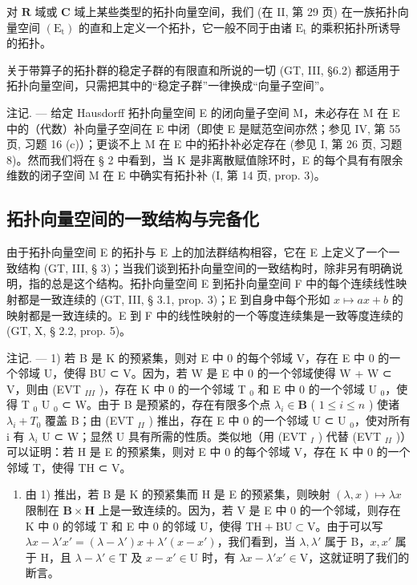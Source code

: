 对 \(\mathbf{R}\) 域或 \(\mathbf{C}\) 域上某些类型的拓扑向量空间，我们 (在 II, 第 29 页) 在一族拓扑向量空间 \((\mathrm{E}_{\mathrm{t}})\) 的直和上定义一个拓扑，它一般不同于由诸 \(\mathrm{E}_{\mathrm{t}}\) 的乘积拓扑所诱导的拓扑。

关于带算子的拓扑群的稳定子群的有限直和所说的一切 (GT, III, §6.2) 都适用于拓扑向量空间，只需把其中的“稳定子群”一律换成“向量子空间”。

注记. --- 给定 Hausdorff 拓扑向量空间 E 的闭向量子空间 M，未必存在 M 在 E 中的（代数）补向量子空间在 E 中闭（即使 E 是赋范空间亦然；参见 IV, 第 55 页, 习题 16 (c)）；更谈不上 M 在 E 中的拓扑补必定存在 (参见 I, 第 26 页, 习题 8)。然而我们将在 § 2 中看到，当 K 是非离散赋值除环时，E 的每个具有有限余维数的闭子空间 M 在 E 中确实有拓扑补 (I, 第 14 页, prop. 3)。

\subsection{拓扑向量空间的一致结构与完备化}

由于拓扑向量空间 E 的拓扑与 E 上的加法群结构相容，它在 E 上定义了一个一致结构 (GT, III, § 3)；当我们谈到拓扑向量空间的一致结构时，除非另有明确说明，指的总是这个结构。拓扑向量空间 E 到拓扑向量空间 F 中的每个连续线性映射都是一致连续的 (GT, III, § 3.1, prop. 3)；E 到自身中每个形如 \(x \mapsto ax + b\) 的映射都是一致连续的。E 到 F 中的线性映射的一个等度连续集是一致等度连续的 (GT, X, § 2.2, prop. 5)。

注记. --- 1) 若 B 是 K 的预紧集，则对 E 中 0 的每个邻域 V，存在 E 中 0 的一个邻域 U，使得 BU ⊂ V。因为，若 W 是 E 中 0 的一个邻域使得 W + W ⊂ V，则由 (EVT \(_{III}\) )，存在 K 中 0 的一个邻域 T \(_{0}\) 和 E 中 0 的一个邻域 U \(_{0}\)，使得 T \(_{0}\) U \(_{0}\) ⊂ W。由于 B 是预紧的，存在有限多个点 \(\lambda_{i} \in \mathbf{B}\) ( \(1 \leqslant i \leqslant n\) ) 使诸 \(\lambda_{i} + T_{0}\) 覆盖 B；由 (EVT \(_{II}\) ) 推出，存在 E 中 0 的一个邻域 U ⊂ U \(_{0}\)，使对所有 i 有 \(\lambda_{i}\) U ⊂ W；显然 U 具有所需的性质。类似地（用 (EVT \(_{I}\) ) 代替 (EVT \(_{II}\) )）可以证明：若 H 是 E 的预紧集，则对 E 中 0 的每个邻域 V，存在 K 中 0 的一个邻域 T，使得 TH ⊂ V。

\begin{enumerate}
\def\labelenumi{\arabic{enumi})}
\setcounter{enumi}{1}
\tightlist
\item
  由 1) 推出，若 B 是 K 的预紧集而 H 是 E 的预紧集，则映射 \((\lambda, x) \mapsto \lambda x\) 限制在 \(\mathbf{B} \times \mathbf{H}\) 上是一致连续的。因为，若 V 是 E 中 0 的一个邻域，则存在 K 中 0 的邻域 T 和 E 中 0 的邻域 U，使得 \(\mathrm{TH} + \mathrm{BU} \subset \mathrm{V}\)。由于可以写 \(\lambda x - \lambda' x' = (\lambda - \lambda') x + \lambda'(x - x')\)，我们看到，当 \(\lambda, \lambda'\) 属于 B，\(x, x'\) 属于 H，且 \(\lambda - \lambda' \in \mathrm{T}\) 及 \(x - x' \in \mathrm{U}\) 时，有 \(\lambda x - \lambda' x' \in \mathrm{V}\)，这就证明了我们的断言。
\end{enumerate}


